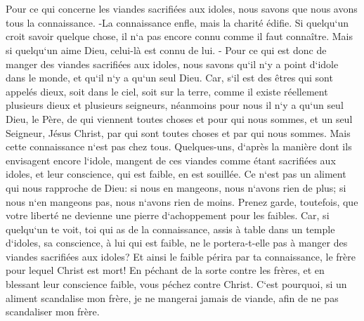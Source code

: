 \chapter{}

\verse Pour ce qui concerne les viandes sacrifiées aux idoles, nous savons que nous avons tous la connaissance. -La connaissance enfle, mais la charité édifie. 
\verse Si quelqu`un croit savoir quelque chose, il n`a pas encore connu comme il faut connaître. 
\verse Mais si quelqu`un aime Dieu, celui-là est connu de lui. - 
\verse Pour ce qui est donc de manger des viandes sacrifiées aux idoles, nous savons qu`il n`y a point d`idole dans le monde, et qu`il n`y a qu`un seul Dieu. 
\verse Car, s`il est des êtres qui sont appelés dieux, soit dans le ciel, soit sur la terre, comme il existe réellement plusieurs dieux et plusieurs seigneurs, 
\verse néanmoins pour nous il n`y a qu`un seul Dieu, le Père, de qui viennent toutes choses et pour qui nous sommes, et un seul Seigneur, Jésus Christ, par qui sont toutes choses et par qui nous sommes. 
\verse Mais cette connaissance n`est pas chez tous. Quelques-uns, d`après la manière dont ils envisagent encore l`idole, mangent de ces viandes comme étant sacrifiées aux idoles, et leur conscience, qui est faible, en est souillée. 
\verse Ce n`est pas un aliment qui nous rapproche de Dieu: si nous en mangeons, nous n`avons rien de plus; si nous n`en mangeons pas, nous n`avons rien de moins. 
\verse Prenez garde, toutefois, que votre liberté ne devienne une pierre d`achoppement pour les faibles. 
\verse Car, si quelqu`un te voit, toi qui as de la connaissance, assis à table dans un temple d`idoles, sa conscience, à lui qui est faible, ne le portera-t-elle pas à manger des viandes sacrifiées aux idoles? 
\verse Et ainsi le faible périra par ta connaissance, le frère pour lequel Christ est mort! 
\verse En péchant de la sorte contre les frères, et en blessant leur conscience faible, vous péchez contre Christ. 
\verse C`est pourquoi, si un aliment scandalise mon frère, je ne mangerai jamais de viande, afin de ne pas scandaliser mon frère. 

\chapter{}

